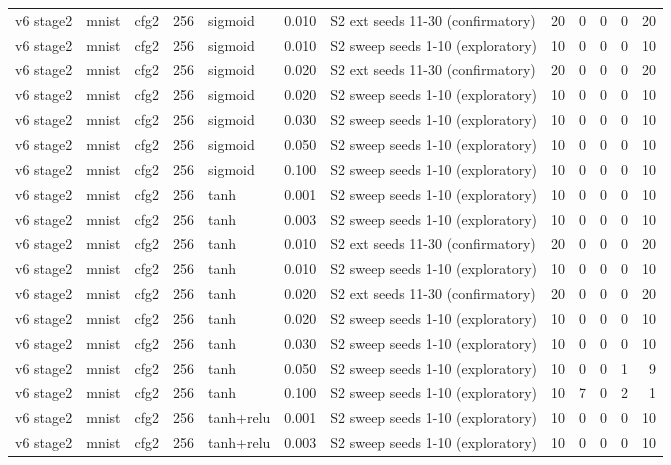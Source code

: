 \begin{table}[htbp]
{\begin{tabular}{@{}lllrlrlrrrrr@{}}
v6 stage2 & mnist & cfg2 & 256 & sigmoid & 0.010 & S2 ext seeds 11-30 (confirmatory) & 20 & 0 & 0 & 0 & 20 \\
v6 stage2 & mnist & cfg2 & 256 & sigmoid & 0.010 & S2 sweep seeds 1-10 (exploratory) & 10 & 0 & 0 & 0 & 10 \\
v6 stage2 & mnist & cfg2 & 256 & sigmoid & 0.020 & S2 ext seeds 11-30 (confirmatory) & 20 & 0 & 0 & 0 & 20 \\
v6 stage2 & mnist & cfg2 & 256 & sigmoid & 0.020 & S2 sweep seeds 1-10 (exploratory) & 10 & 0 & 0 & 0 & 10 \\
v6 stage2 & mnist & cfg2 & 256 & sigmoid & 0.030 & S2 sweep seeds 1-10 (exploratory) & 10 & 0 & 0 & 0 & 10 \\
v6 stage2 & mnist & cfg2 & 256 & sigmoid & 0.050 & S2 sweep seeds 1-10 (exploratory) & 10 & 0 & 0 & 0 & 10 \\
v6 stage2 & mnist & cfg2 & 256 & sigmoid & 0.100 & S2 sweep seeds 1-10 (exploratory) & 10 & 0 & 0 & 0 & 10 \\
v6 stage2 & mnist & cfg2 & 256 & tanh & 0.001 & S2 sweep seeds 1-10 (exploratory) & 10 & 0 & 0 & 0 & 10 \\
v6 stage2 & mnist & cfg2 & 256 & tanh & 0.003 & S2 sweep seeds 1-10 (exploratory) & 10 & 0 & 0 & 0 & 10 \\
v6 stage2 & mnist & cfg2 & 256 & tanh & 0.010 & S2 ext seeds 11-30 (confirmatory) & 20 & 0 & 0 & 0 & 20 \\
v6 stage2 & mnist & cfg2 & 256 & tanh & 0.010 & S2 sweep seeds 1-10 (exploratory) & 10 & 0 & 0 & 0 & 10 \\
v6 stage2 & mnist & cfg2 & 256 & tanh & 0.020 & S2 ext seeds 11-30 (confirmatory) & 20 & 0 & 0 & 0 & 20 \\
v6 stage2 & mnist & cfg2 & 256 & tanh & 0.020 & S2 sweep seeds 1-10 (exploratory) & 10 & 0 & 0 & 0 & 10 \\
v6 stage2 & mnist & cfg2 & 256 & tanh & 0.030 & S2 sweep seeds 1-10 (exploratory) & 10 & 0 & 0 & 0 & 10 \\
v6 stage2 & mnist & cfg2 & 256 & tanh & 0.050 & S2 sweep seeds 1-10 (exploratory) & 10 & 0 & 0 & 1 & 9 \\
v6 stage2 & mnist & cfg2 & 256 & tanh & 0.100 & S2 sweep seeds 1-10 (exploratory) & 10 & 7 & 0 & 2 & 1 \\
v6 stage2 & mnist & cfg2 & 256 & tanh+relu & 0.001 & S2 sweep seeds 1-10 (exploratory) & 10 & 0 & 0 & 0 & 10 \\
v6 stage2 & mnist & cfg2 & 256 & tanh+relu & 0.003 & S2 sweep seeds 1-10 (exploratory) & 10 & 0 & 0 & 0 & 10 \\

\end{tabular}}
\end{table}
